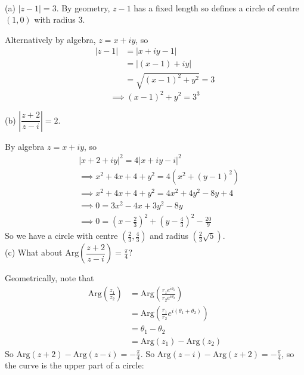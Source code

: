 \documentclass[10pt]{scrartcl}
\begin{document}
\begin{examples}~

(a) $|z-1| = 3$. By geometry, $z-1$ has a fixed length so defines a circle  of centre $(1,0)$ with radius $3$. 
\begin{center}
\end{center}

Alternatively by algebra, $z = x+iy$, so 
\begin{align*}
  |z-1| &= |x+iy -1|\\
  &= |(x-1) + iy|\\
  &= \sqrt{(x-1)^2 + y^2} = 3
\end{align*}
\[
  \implies (x-1)^2 + y^2 = 3^3
\]


(b) $\left|\dfrac{z+2}{z-i}\right| = 2$. 

By algebra $z = x+iy$, so 
\begin{align*}
  &|x+2+iy|^2 = 4|x+iy-i|^2\\
  &\implies x^2 + 4x + 4 + y^2 = 4(x^2 + (y-1)^2)\\
  &\implies x^2 + 4x + 4 + y^2 = 4x^2 + 4y^2 -8y + 4\\\
  &\implies 0 = 3x^2 - 4x + 3y^2 - 8y\\
  &\implies 0 = \textstyle{(x-\frac{2}{3})^2 + (y-\frac{4}{3})^2 - \frac{20}{9}}
\end{align*}
So we have a circle with centre $(\frac{2}{3},\frac{4}{3})$ and radius $(\frac{2}{3}\sqrt{5})$. \\


(c) What about $\mathrm{Arg}\left(\dfrac{z+2}{z-i}\right) = \frac{\pi}{4}$?


Geometrically, note that 
\begin{align*}
  \mathrm{Arg}\left(\frac{z_1}{z_2}\right) &= \mathrm{Arg}\left(\frac{r_1e^{i\theta_1}}{r_2e^{i\theta_2}}\right)\\
  &= \mathrm{Arg}\left(\frac{r_1}{r_2}e^{i(\theta_1 + \theta_2)}\right)\\
  &= \theta_1 - \theta_2\\
  &= \mathrm{Arg}(z_1) - \mathrm{Arg}(z_2)
\end{align*}
So $\mathrm{Arg}(z+2) - \mathrm{Arg}(z-i) = -\frac{\pi}{4}$. So $\mathrm{Arg}(z-i)-\mathrm{Arg}(z+2)  = -\frac{\pi}{4}$, so the curve is the upper part of a circle: 


\begin{center}
\end{center}
\end{examples}
\end{document}
